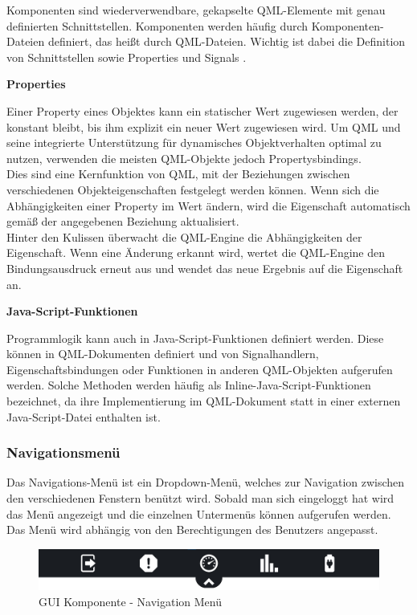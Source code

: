 Komponenten sind wiederverwendbare, gekapselte QML-Elemente mit genau definierten Schnittstellen. Komponenten werden häufig durch Komponenten-Dateien definiert, das heißt durch QML-Dateien. Wichtig ist dabei die Definition von Schnittstellen sowie Properties und Signals .

\textbf{Properties}\\
\vspace{2mm}

Einer Property eines Objektes kann ein statischer Wert zugewiesen werden, der konstant bleibt, bis ihm explizit ein neuer Wert zugewiesen wird. Um QML und seine integrierte Unterstützung für dynamisches Objektverhalten optimal zu nutzen, verwenden die meisten QML-Objekte jedoch Propertysbindings.\\
Dies sind eine Kernfunktion von QML, mit der Beziehungen zwischen verschiedenen Objekteigenschaften festgelegt werden können. Wenn sich die Abhängigkeiten einer Property im Wert ändern, wird die Eigenschaft automatisch gemäß der angegebenen Beziehung aktualisiert.\\
Hinter den Kulissen überwacht die QML-Engine die Abhängigkeiten der Eigenschaft. Wenn eine Änderung erkannt wird, wertet die QML-Engine den Bindungsausdruck erneut aus und wendet das neue Ergebnis auf die Eigenschaft an.

\textbf{Java-Script-Funktionen}\\
\vspace{2mm}

Programmlogik kann auch in Java-Script-Funktionen definiert werden. Diese können in QML-Dokumenten definiert und von Signalhandlern, Eigenschaftsbindungen oder Funktionen in anderen QML-Objekten aufgerufen werden. Solche Methoden werden häufig als Inline-Java-Script-Funktionen bezeichnet, da ihre Implementierung im QML-Dokument statt in einer externen Java-Script-Datei enthalten ist.

\subsubsection{Navigationsmenü}

Das Navigations-Menü ist ein Dropdown-Menü, welches zur Navigation zwischen den verschiedenen Fenstern benützt wird. Sobald man sich eingeloggt hat wird das Menü angezeigt und die einzelnen Untermenüs können aufgerufen werden. Das Menü wird abhängig von den Berechtigungen des Benutzers angepasst.

\begin{figure}[H]
	\begin{center}
		\includegraphics[scale=0.2]{figures/hcis/component_menu.png}
		\caption{GUI Komponente - Navigation Menü}
		\label{fig:kompNavigation}
	\end{center}
\end{figure}

